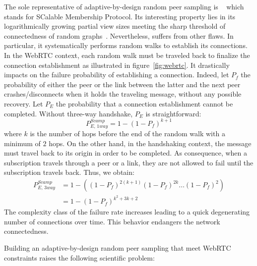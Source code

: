 The sole representative of adaptive-by-design random peer sampling is
\SCAMP~\cite{ganesh2001scamp,ganesh2003peer} which stands for
SCalable Membership Protocol. Its interesting property lies in its
logarithmically growing partial view sizes meeting the sharp threshold
of connectedness of random
graphs~\cite{erdos1959random}. Nevertheless, \SCAMP suffers from
other flaws. In particular, it systematically performs random walks to
establish its connections. In the WebRTC context, each random walk
must be traveled back to finalize the connection establishment as
illustrated in figure~\ref{fig:webrtc}. It drastically impacts on the
\SCAMP failure probability of establishing a connection. Indeed, let
$P_f$ the probability of either the peer or the link between the
latter and the next peer crashes/disconnects when it holds the
traveling message, without any possible recovery. Let $P_E$ the
probability that a connection establishment cannot be
completed. Without three-way handshake, $P_E$ is straightforward:
\begin{equation} P_{E,\,1way}^{Scamp}=1-(1- P_f)^{k+1} \end{equation} where $k$
is the number of hops before the end of the random walk with a minimum of $2$
hops. On the other hand, in the handshaking context, the message must travel
back to its origin in order to be completed. As consequence, when a
subscription travels through a peer or a link, they are not allowed to fail
until the subscription travels back. Thus, we obtain:
\begin{align} P_{E,\,3way}^{Scamp} &=1 - ((1-P_f)^{2(k+1)} (1-P_f)^{2k}
                                     \ldots (1-P_f)^2) \nonumber \\
                                   &=1-(1-P_f)^{k^2+3k+2}
\end{align}
The complexity class of the \SCAMP failure rate increases leading to a quick
degenerating number of connections over time. This behavior endangers the
network connectedness.

Building an adaptive-by-design random peer sampling that meet WebRTC
constraints raises the following scientific problem:

